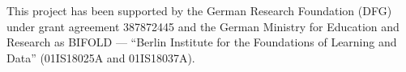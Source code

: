 \documentclass[sigconf, nonacm]{acmart}
\begin{document}













\begin{acks} 
This project has been supported by the German Research Foundation (DFG) under grant agreement 387872445 and the German Ministry for Education and Research as BIFOLD — “Berlin Institute for the Foundations of Learning and Data” (01IS18025A and 01IS18037A).
\end{acks}

\balance

%
 

\end{document}
